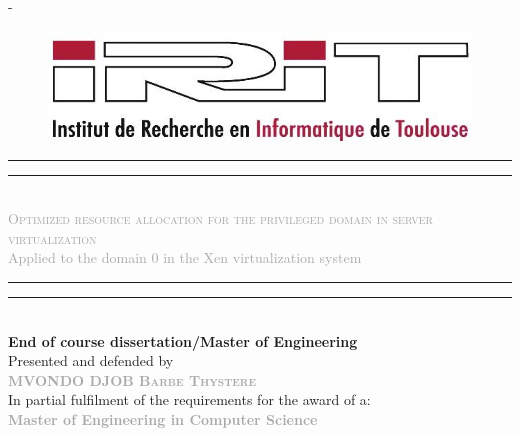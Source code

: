 \begin{titlingpage}
\begin{SingleSpace}

\begin{adjustwidth*}{\unitlength}{-\unitlength}
\begin{figure}
\centering 
\includegraphics[scale=0.5]{logos/IRIT-rd.jpg}
\end{figure}
\hspace{3cm}
\vspace{0.5cm}
\begin{center}
\rule[0.5ex]{\linewidth}{2pt}\vspace*{-\baselineskip}\vspace*{3.2pt}
\rule[0.5ex]{\linewidth}{1pt}\\[\baselineskip]
{\LARGE{\textcolor{darkgray} {\textsc{Optimized resource allocation for the privileged domain in server virtualization}
}}}\\[4mm]
{\Large \textcolor{darkgray}{Applied to the domain 0 in the Xen virtualization system}}\\
\rule[0.5ex]{\linewidth}{1pt}\vspace*{-\baselineskip}\vspace{3.2pt}
\rule[0.5ex]{\linewidth}{2pt}\\
\vspace{6mm}
{\Large \textbf{End of course dissertation/Master of Engineering}}\\
\vspace{6mm}
{\Large Presented and defended by } \\
\vspace{6mm}
{\Large \textsc{\textbf{\textcolor{darkgray}{MVONDO DJOB Barbe Thystere }}}}\\
\vspace{8mm}
{\Large In partial fulfilment of the requirements for the award of a:} \\
\vspace{6mm}
{\Large \textbf{\textcolor{darkgray}{Master of Engineering in Computer Science }}}\\
\vspace{6mm}

\end{center}
\end{adjustwidth*}
\end{SingleSpace}
\end{titlingpage}

